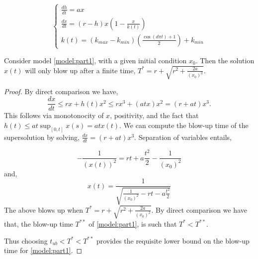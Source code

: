 \documentclass[10pt,a4paper]{amsart}
\begin{document}
\begin{equation}\label{model:part1}
    \begin{cases}
        \frac{dh}{dt} = a x \\
        \frac{dx}{dt} = (r - h) x \left(1 - \frac{x}{k(t)}\right)\\
        k(t)=(k_{max}-k_{min})\left ( \frac{\cos(d\pi t) +1}{2}\right)+k_{min}
    \end{cases}
\end{equation}

\begin{lemma}
Consider model \ref{model:part1}, with a given initial condition $x_{0}$. Then the solution $x(t)$ will only blow up after a finite time, $T^{*} = r + \sqrt{r^{2}+\frac{2a}{(x_{0})^{2}}}$.
\end{lemma}

\begin{proof}
    By direct comparison we have,
    \begin{equation}
        \frac{dx}{dt} \leq rx + h(t) x^{2} \leq rx^{3} + (a t x)x^{2} = (r+at)x^{3}.
    \end{equation}
    This follows via monotonocity of $x$, positivity, and the fact that $h(t) \leq a t\sup_{[0,t]} x(s) = a t x(t)$.
    We can compute the blow-up time of the supersolution by solving, $\frac{dx}{dt} = (r+at)x^{3}$. Separation of variables entails,

    \begin{equation}
        -\frac{1}{(x(t))^{2}} = rt + a \frac{t^{2}}{2} -  \frac{1}{(x_{0})^{2}} 
    \end{equation}
    and,
     \begin{equation}
       x(t)= \frac{1}{\sqrt{\frac{1}{(x_{0})^{2}} - rt - a \frac{t^{2}}{2}}}
    \end{equation}
    The above blows up when $T^{*} = r + \sqrt{r^{2}+\frac{2a}{(x_{0})^{2}}}$.
    By direct comparison we have that, the blow-up time $T^{**}$ of \ref{model:part1}, is such that 
$T^{*} < T^{**}$.
    
    Thus choosing $t_{ub} < T^{*} < T^{**}$ provides the requisite lower bound on the blow-up time for \ref{model:part1}. 
\end{proof}
\end{document}
